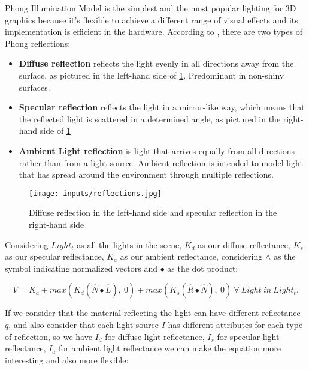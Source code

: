 \documentclass[cic,tc,english]{iiufrgs}
\begin{document}
Phong Illumination Model is the simplest and the most popular lighting for 3D graphics because it's flexible to achieve a different range of visual effects and its implementation is efficient in the hardware. According to \citet{Buss2003computergraphicsmathematical}, there are two types of Phong reflections:

\begin{itemize}
    \item \textbf{Diffuse reflection} reflects the light evenly in all directions away from the surface, as pictured in the left-hand side of \cref{reflections}. Predominant in non-shiny surfaces.
    \item \textbf{Specular reflection} reflects the light in a mirror-like way, which means that the reflected light is scattered in a determined angle, as pictured in the right-hand side of \cref{reflections}
    \item \textbf{Ambient Light reflection} is light that arrives equally from all directions rather than from a light source. Ambient reflection is intended to model light that has spread around the environment through multiple reflections.
\end{itemize}

\begin{figure}[h!]
    \caption{Diffuse reflection in the left-hand side and specular reflection in the right-hand side}
    \begin{center}
        \texttt{[image: inputs/reflections.jpg]}
    \end{center}
    \label{reflections}
\end{figure}

Considering $Light_t$ as all the lights in the scene, $K_d$ as our diffuse reflectance, $K_s$ as our specular reflectance, $K_a$ as our ambient reflectance, considering $\wedge$ as the symbol indicating normalized vectors and $\bullet$ as the dot product:

\begin{equation}
    V = K_a + max(K_d(\hat N \bullet \hat L),\ 0) + max(K_s(\hat R \bullet \hat N),\ 0)\ \forall\  Light\ in\ Light_t.
\end{equation}

\newpage
If we consider that the material reflecting the light can have different reflectance $q$, and also consider that each light source $I$ has different attributes for each type of reflection, so we have $I_d$ for diffuse light reflectance, $I_s$ for specular light reflectance, $I_a$ for ambient light reflectance we can make the equation more interesting and also more flexible:
\end{document}

